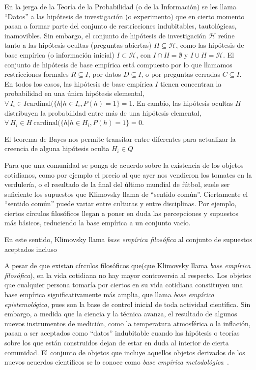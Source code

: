 \documentclass[a4paper,11pt]{book}
\theoremstyle{definition}
\begin{document}
En la jerga de la Teor\'ia de la Probabilidad (o de la Información) se les llama ``Datos'' a las hipótesis de investigación (o experimento) que en cierto momento pasan a formar parte del conjunto de restricciones indubitables, tautológicas, inamovibles.
%
Sin embargo, el conjunto de hipótesis de investigación $\mathcal{H}$ reúne tanto a las hipótesis ocultas (preguntas abiertas) $H \subseteq \mathcal{H}$, como las hipótesis de base emp\'irica (o información inicial) $I \subset \mathcal{H}$, con $I \cap H = \emptyset$ y $I \cup H = \mathcal{H}$.
%
El conjunto de hipótesis de base emp\'irica está compuesto por lo que llamamos restricciones formales $R \subseteq I$, por datos $D \subseteq I$, o por preguntas cerradas $C \subseteq I$.
%
En todos los casos, las hipótesis de base emp\'irica $I$ tienen concentran la probabilidad en una única hipótesis elemental, $\forall \, I_i \in I \text{cardinal}( \{h | h \in I_i, P(h)=1 \}=1$.
%
En cambio, las hipótesis ocultas $H$ distribuyen la probabilidad entre más de una hipótesis elemental, $\forall \,H_i \in H  \ \text{cardinal}( \{h | h \in H_i, P(h)=1 \}=0$.


El teorema de Bayes nos permite transitar entre diferentes para actualizar la creencia de alguna hipótesis oculta $H_i \in Q$

%
Para que una comunidad se ponga de acuerdo sobre la existencia de los objetos cotidianos, como por ejemplo el precio al que ayer nos vendieron los tomates en la verduler\'ia, o el resultado de la final del \'ultimo mundial de f\'utbol, suele ser suficiente los supuestos que Klimovsky llama de ``sentido com\'un''.
%
Ciertamente el ``sentido común'' puede variar entre culturas y entre disciplinas.
%
Por ejemplo, ciertos c\'irculos filosóficos llegan a poner en duda las percepciones y supuestos m\'as b\'asicos, reduciendo la base emp\'irica a un conjunto vac\'io.



En este sentido, Klimovsky llama \emph{base emp\'irica filos\'ofica} al conjunto de supuestos aceptados incluso

A pesar de que existan c\'irculos filos\'oficos que(que Klimovsky llama \emph{base emp\'irica filos\'ofica}), en la vida cotidiana no hay mayor controversia al respecto.
%
Los objetos que cualquier persona tomar\'ia por ciertos en su vida cotidiana constituyen una base emp\'irica significativamente m\'as amplia, que llama \emph{base emp\'irica epistemol\'ogica}, pues son la base de control inicial de toda actividad cient\'ifica.
%
Sin embargo, a medida que la ciencia y la t\'ecnica avanza, el resultado de algunos nuevos instrumentos de medici\'on, como la temperatura atmosf\'erica o la inflaci\'on, pasan a ser aceptados como ``datos'' indubitable cuando las hip\'otesis o teor\'ias sobre los que est\'an construidos dejan de estar en duda al interior de cierta comunidad.
%
El conjunto de objetos que incluye aquellos objetos derivados de los nuevos acuerdos cient\'ificos se lo conoce como \emph{base emp\'irica metodol\'ogica}~\cite{klimovsky1994-desventuras}.
\end{document}
